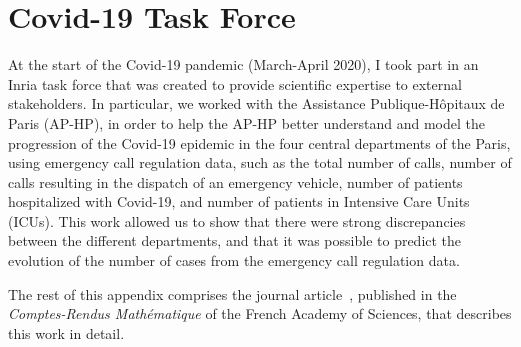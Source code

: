 \chapter{Covid-19 Task Force}
\label{chap:covid}

At the start of the Covid-19 pandemic (March-April 2020), I took part in an Inria task force that was created to provide scientific expertise to external stakeholders.
In particular, we worked with the Assistance Publique-Hôpitaux de Paris (AP-HP), in order to help the AP-HP better understand and model the progression of the Covid-19 epidemic in the four central departments of the Paris, using emergency call regulation data, such as the total number of calls, number of calls resulting in the dispatch of an emergency vehicle, number of patients hospitalized with Covid-19, and number of patients in Intensive Care Units (ICUs).
This work allowed us to show that there were strong discrepancies between the different departments, and that it was possible to predict the evolution of the number of cases from the emergency call regulation data.

The rest of this appendix comprises the journal article~\citep{gaubert2020}, published in the \emph{Comptes-Rendus Mathématique} of the French Academy of Sciences, that describes this work in detail.


